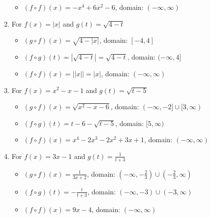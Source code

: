 \begin{enumerate}
\begin{itemize}
\item  $(f \circ f)(x) = -x^4+6x^2-6$, domain: $(-\infty, \infty)$

\end{itemize}

\item For   $f(x) = |x|$ and $g(t) = \sqrt{4-t}$

\begin{itemize}

\item  $(g \circ f)(x) = \sqrt{4-|x|}$, domain: $[-4,4]$

\item  $(f \circ g)(t) =|\sqrt{4-t}| = \sqrt{4-t}$, domain: $(-\infty, 4]$

\item  $(f \circ f)(x) = | |x| | = |x|$, domain: $(-\infty, \infty)$

\end{itemize}


\enlargethispage{0.25in}

\item For  $f(x) = x^2-x-1$ and $g(t) = \sqrt{t-5}$ 

\begin{itemize}

\item  $(g \circ f)(x) = \sqrt{x^2-x-6}$, domain: $(-\infty, -2] \cup [3,\infty)$

\item  $(f \circ g)(t) =t-6-\sqrt{t-5}$, domain: $[5,\infty)$

\item  $(f \circ f)(x) =x^4-2x^3-2x^2+3x+1$, domain: $(-\infty, \infty)$

\end{itemize}


\item For   $f(x) = 3x-1$ and $g(t) = \frac{1}{t+3}$

\begin{itemize}

\item  $(g \circ f)(x) = \frac{1}{3x+2}$, domain: $\left(-\infty, -\frac{2}{3}\right) \cup \left(-\frac{2}{3}, \infty\right)$

\item  $(f \circ g)(t) = -\frac{t}{t+3}$, domain: $\left(-\infty, -3\right) \cup \left(-3, \infty\right)$

\item  $(f \circ f)(x) = 9x-4$, domain: $(-\infty, \infty)$


\end{itemize}
\end{enumerate}
